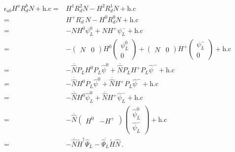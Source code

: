 \begin{align}
\label{eq:HRdN}
\epsilon_{ab}H^a R_d^b N+\text{h.c}=&H^1 R_d^2 N-H^2 R_d^1 N+\text{h.c}\nonumber\\
 =&H^+ R_d^- N-H^0 R_d^0 N+\text{h.c}\nonumber\\
=&-N H^0 \psi_L^0  +N H^+ \psi_{L}^- +\text{h.c}\nonumber\\
=&- \begin{pmatrix}
   N & 0
 \end{pmatrix}
H^0 
\begin{pmatrix}
  \psi_L^0\\
   0
\end{pmatrix}
+
\begin{pmatrix}
N & 0  
\end{pmatrix}
 H^+ 
  \begin{pmatrix}
\psi_{L}^-\\
   0    
  \end{pmatrix}
+\text{h.c}\nonumber\\
=&-\overline{\widehat{N}}P_L H^0 P_L\widehat{\psi}^0+\overline{\widehat{N}}P_L H^+P_L \widehat{\psi}^-+\text{h.c} \nonumber\\
=&-\overline{\widehat{N}}H^0 P_L\widehat{\psi}^0+\overline{\widehat{N}}H^+P_L \widehat{\psi}^-+\text{h.c} \nonumber\\
=&-\overline{\widehat{N}} H^0 \widehat{\psi}^0_L+\overline{\widehat{N}} H^+\widehat{\psi}^-_L +\text{h.c}\nonumber\\
=&-\overline{\widehat{N}}
\begin{pmatrix}
  H^0 & -H^{+}
\end{pmatrix}
\begin{pmatrix}
\widehat{\psi}_L^0\\
\widehat{\psi}_L^-  
\end{pmatrix}+\text{h.c}\nonumber\\
=&-\overline{\widehat{N}}\widetilde{H}^{\dagger} \widehat{\Psi}_L-\overline{\widehat{\Psi}_L}\widetilde{H} \widehat{N}\,.
\end{align}

